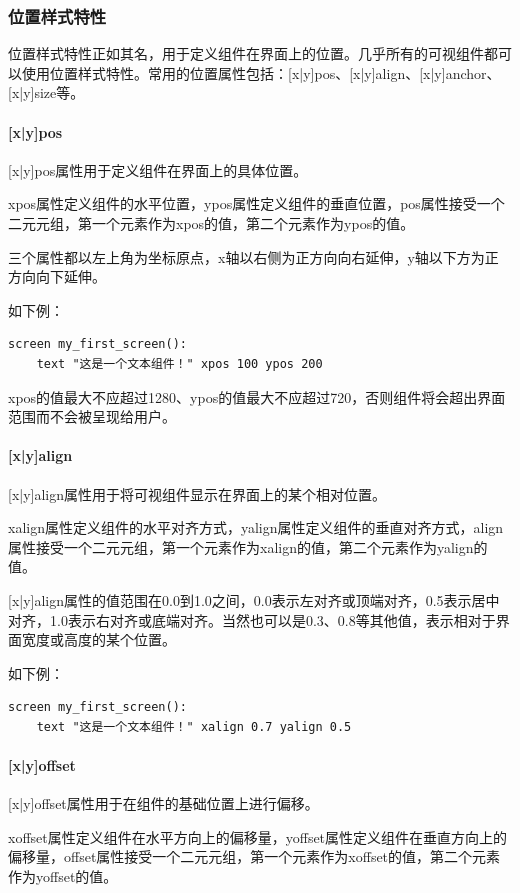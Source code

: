 \documentclass[../../Main.tex]{subfiles}
\begin{document}
\subsubsection{位置样式特性}

位置样式特性正如其名，用于定义组件在界面上的位置。几乎所有的可视组件都可以使用位置样式特性。常用的位置属性包括：[x|y]pos、[x|y]align、[x|y]anchor、[x|y]size等。

\paragraph{[x|y]pos}
[x|y]pos属性用于定义组件在界面上的具体位置。

xpos属性定义组件的水平位置，ypos属性定义组件的垂直位置，pos属性接受一个二元元组，第一个元素作为xpos的值，第二个元素作为ypos的值。

三个属性都以左上角为坐标原点，x轴以右侧为正方向向右延伸，y轴以下方为正方向向下延伸。

如下例：
\begin{lstlisting}
screen my_first_screen():
    text "这是一个文本组件！" xpos 100 ypos 200
\end{lstlisting}

xpos的值最大不应超过1280、ypos的值最大不应超过720，否则组件将会超出界面范围而不会被呈现给用户。

\paragraph{[x|y]align}
[x|y]align属性用于将可视组件显示在界面上的某个相对位置。

xalign属性定义组件的水平对齐方式，yalign属性定义组件的垂直对齐方式，align属性接受一个二元元组，第一个元素作为xalign的值，第二个元素作为yalign的值。

[x|y]align属性的值范围在0.0到1.0之间，0.0表示左对齐或顶端对齐，0.5表示居中对齐，1.0表示右对齐或底端对齐。当然也可以是0.3、0.8等其他值，表示相对于界面宽度或高度的某个位置。


如下例：
\begin{lstlisting}
screen my_first_screen():
    text "这是一个文本组件！" xalign 0.7 yalign 0.5
\end{lstlisting}

\paragraph{[x|y]offset}
[x|y]offset属性用于在组件的基础位置上进行偏移。

xoffset属性定义组件在水平方向上的偏移量，yoffset属性定义组件在垂直方向上的偏移量，offset属性接受一个二元元组，第一个元素作为xoffset的值，第二个元素作为yoffset的值。
\end{document}
